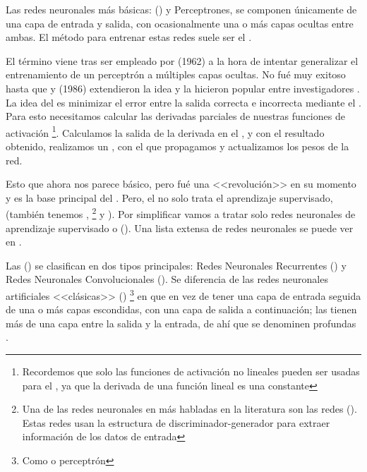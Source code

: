 Las redes neuronales más básicas:  () y Perceptrones, se componen únicamente de una capa de entrada y salida, con ocasionalmente una o más capas ocultas entre ambas. El método para entrenar estas redes suele ser el .

El término  viene tras ser empleado por  (1962)  a la hora de intentar generalizar el entrenamiento de un perceptrón a múltiples capas ocultas. No fué muy exitoso hasta que  y  (1986)  extendieron la idea y la hicieron popular entre investigadores . La idea del  es minimizar el error entre la salida correcta e incorrecta mediante el . Para esto necesitamos calcular las derivadas parciales de nuestras funciones de activación \footnote{Recordemos que solo las funciones de activación no lineales pueden ser usadas para el , ya que la derivada de una función lineal es una constante}. Calculamos la salida de la derivada en el , y con el resultado obtenido, realizamos un , con el que propagamos y actualizamos los pesos de la red.

Esto que ahora nos parece básico, pero fué una <<revolución>> en su momento y es la base principal del . Pero, el  no solo trata el aprendizaje supervisado, (también tenemos , \footnote{Una de las redes neuronales en  más habladas en la literatura son las redes  (). Estas redes usan la estructura de discriminador-generador  para extraer información de los datos de entrada} y ). Por simplificar vamos a tratar solo redes neuronales de aprendizaje supervisado o  (). Una lista extensa de redes neuronales se puede ver en .

Las  () se clasifican en dos tipos principales: Redes Neuronales Recurrentes () y Redes Neuronales Convolucionales (). Se diferencia de las redes neuronales artificiales <<clásicas>> () \footnote{Como  o perceptrón} en que en vez de tener una capa de entrada seguida de una o más capas escondidas, con una capa de salida a continuación; las  tienen más de una capa entre la salida y la entrada, de ahí que se denominen profundas .

